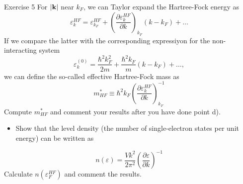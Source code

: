 \documentclass[%
twoside,                 %
final,                   %
10pt]{article}
\begin{document}
\begin{block}{Exercise 5 }
\noindent
For $\vert{\bf k}\vert$ near $k_{F}$, we can Taylor expand the Hartree-Fock energy as  
\[
\varepsilon_{k}^{HF}=\varepsilon_{k_{F}}^{HF}+
\left(\frac{\partial\varepsilon_{k}^{HF}}{\partial k}\right)_{k_{F}}(k-k_{F})+\dots
\]
If we compare the latter with the corresponding expressiyon for the non-interacting system
\[
\varepsilon_{k}^{(0)}=\frac{\hbar^{2}k^{2}_{F}}{2m}+
\frac{\hbar^{2}k_{F}}{m}\left(k-k_{F}\right)+\dots ,
\]
we can define the so-called effective Hartree-Fock mass as
\[
m_{HF}^{*}\equiv\hbar^{2}k_{F}\left(
\frac{\partial\varepsilon_{k}^{HF}}
{\partial k}\right)_{k_{F}}^{-1}
\]
Compute $m_{HF}^{*}$ and comment your results after you have done 
point d). \newline
\begin{itemize}
 \item Show that the level density (the number of single-electron states per unit energy) can be written as
\end{itemize}

\noindent
\[
n(\varepsilon)=\frac{Vk^{2}}{2\pi^{2}}\left(
\frac{\partial\varepsilon}{\partial k}\right)^{-1}
\]
Calculate $n(\varepsilon_{F}^{HF})$ and comment the results.


\end{block}



\end{document}
